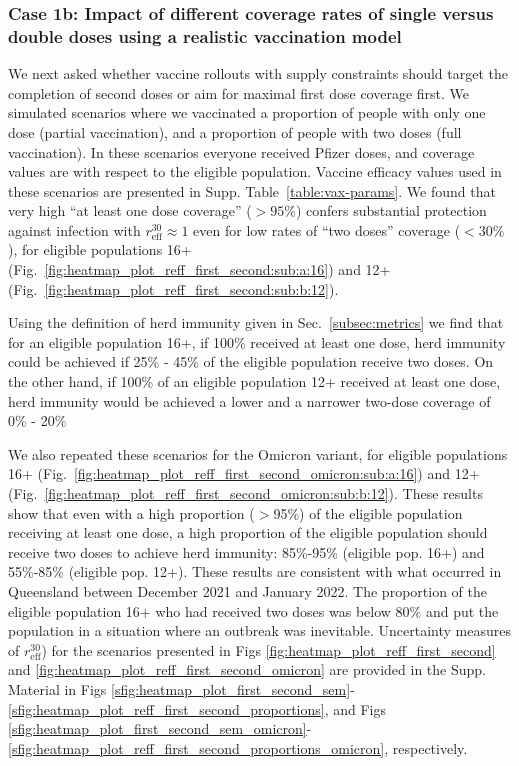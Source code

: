 \documentclass[article, a4, authoryear]{elsarticle}
\begin{document}
\subsubsection*{Case 1b: Impact of different coverage rates of single versus double doses using a realistic vaccination model}
\label{subsubsec:1b}

We next asked whether vaccine rollouts with supply constraints should target the completion of second doses or aim for maximal first dose coverage first. We simulated scenarios where we vaccinated a proportion of people with only one dose (partial vaccination), and a proportion of people with two doses (full vaccination). In these scenarios everyone received Pfizer doses, and coverage values are with respect to the eligible population. Vaccine efficacy values used in these scenarios are presented in Supp. Table~\ref{table:vax-params}. We found that very high ``at least one  dose coverage'' ($>95\%$) confers substantial protection against infection with $r_\mathrm{eff}^{30} \approx 1$ even for low rates of ``two doses'' coverage ($<30\%$), for eligible populations 16+ (Fig.~\ref{fig:heatmap_plot_reff_first_second:sub:a:16}) and 12+ (Fig.~\ref{fig:heatmap_plot_reff_first_second:sub:b:12}). 

Using the definition of herd immunity given in Sec.~\ref{subsec:metrics} we find that for an eligible population 16+, if 100\% received at least one dose, herd immunity could be achieved if 25\% - 45\% of the eligible population receive two doses. On the other hand, if 100\% of an eligible population 12+ received at least one dose, herd immunity would be achieved a lower and a narrower two-dose coverage of 0\% - 20\% 

We also repeated these scenarios for the Omicron variant, for eligible populations 16+ (Fig.~\ref{fig:heatmap_plot_reff_first_second_omicron:sub:a:16}) and 12+ (Fig.~\ref{fig:heatmap_plot_reff_first_second_omicron:sub:b:12}). These results show that even with a high proportion ($>$95\%) of the eligible population receiving at least one dose, a high proportion of the eligible population should receive two doses to achieve herd immunity: 85\%-95\% (eligible pop. 16+) and 55\%-85\% (eligible pop. 12+). These results are consistent with what occurred in Queensland between December 2021 and January 2022. The proportion of the eligible population 16+ who had received two doses was below 80\% and put the population in a situation where an outbreak was inevitable. Uncertainty measures of $r_{\mathrm{eff}}^{30}$) for the scenarios presented in Figs \ref{fig:heatmap_plot_reff_first_second} and \ref{fig:heatmap_plot_reff_first_second_omicron} are provided in the Supp. Material in Figs \ref{sfig:heatmap_plot_first_second_sem}-\ref{sfig:heatmap_plot_reff_first_second_proportions}, and Figs \ref{sfig:heatmap_plot_first_second_sem_omicron}-\ref{sfig:heatmap_plot_reff_first_second_proportions_omicron}, respectively.  
\end{document}
